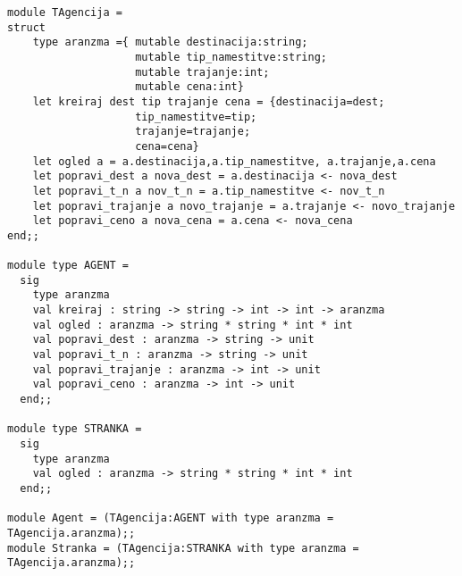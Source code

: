 \begin{Odgovor}{5.3}

\begin{lstlisting}
module TAgencija =
struct
    type aranzma ={ mutable destinacija:string;
                    mutable tip_namestitve:string;
                    mutable trajanje:int;
                    mutable cena:int}
    let kreiraj dest tip trajanje cena = {destinacija=dest;
                    tip_namestitve=tip;
                    trajanje=trajanje;
                    cena=cena}
    let ogled a = a.destinacija,a.tip_namestitve, a.trajanje,a.cena
    let popravi_dest a nova_dest = a.destinacija <- nova_dest
    let popravi_t_n a nov_t_n = a.tip_namestitve <- nov_t_n
    let popravi_trajanje a novo_trajanje = a.trajanje <- novo_trajanje
    let popravi_ceno a nova_cena = a.cena <- nova_cena
end;;

module type AGENT =
  sig
    type aranzma
    val kreiraj : string -> string -> int -> int -> aranzma
    val ogled : aranzma -> string * string * int * int
    val popravi_dest : aranzma -> string -> unit
    val popravi_t_n : aranzma -> string -> unit
    val popravi_trajanje : aranzma -> int -> unit
    val popravi_ceno : aranzma -> int -> unit
  end;;

module type STRANKA =
  sig
    type aranzma
    val ogled : aranzma -> string * string * int * int
  end;;

module Agent = (TAgencija:AGENT with type aranzma = TAgencija.aranzma);;
module Stranka = (TAgencija:STRANKA with type aranzma = TAgencija.aranzma);;

\end{lstlisting}

\end{Odgovor}
